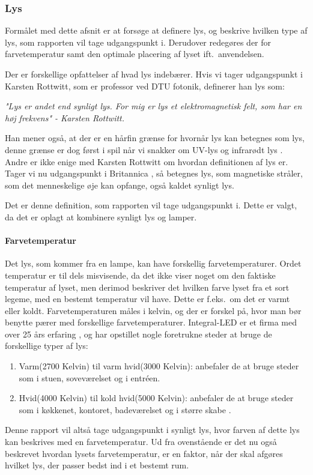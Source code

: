 \subsubsection{Lys}
\label{sec:lys}
Formålet med dette afsnit er at forsøge at definere lys, og beskrive hvilken type af lys, som rapporten vil tage udgangspunkt i. Derudover redegøres der for farvetemperatur samt den optimale placering af lyset ift.\ anvendelsen.


Der er forskellige opfattelser af hvad lys indebærer. Hvis vi tager udgangspunkt i Karsten Rottwitt, som er professor ved DTU fotonik, definerer han lys som:


\textit{"Lys er andet end synligt lys. For mig er lys et elektromagnetisk felt, som har en høj frekvens"
- Karsten Rottwitt\cite{def_lys}.}

Han mener også, at der er en hårfin grænse for hvornår lys kan betegnes som lys, denne grænse er dog først i spil når vi snakker om UV-lys og infrarødt lys \cite{def_lys}. 
Andre er ikke enige med Karsten Rottwitt om hvordan definitionen af lys er. Tager vi nu udgangspunkt i Britannica \cite{britannica_lys}, så betegnes lys, som magnetiske stråler, som det menneskelige øje kan opfange, også kaldet synligt lys. 


Det er denne definition, som rapporten vil tage udgangspunkt i. Dette er valgt, da det er oplagt at kombinere synligt lys og lamper.

\paragraph{Farvetemperatur}
Det lys, som kommer fra en lampe, kan have forskellig farvetemperaturer. Ordet temperatur er til dels misvisende, da det ikke viser noget om den faktiske temperatur af lyset, men derimod beskriver det hvilken farve lyset fra et sort legeme, med en bestemt temperatur vil have\cite{farvetemp}. Dette er f.eks.\ om det er varmt eller koldt. Farvetemperaturen måles i kelvin, og der er forskel på, hvor man bør benytte pærer med forskellige farvetemperaturer. Integral-LED er et firma med over 25 års erfaring \cite{integral_led}, og har opstillet nogle foretrukne steder at bruge de forskellige typer af lys:

\begin{enumerate}
\item Varm(2700 Kelvin) til varm hvid(3000 Kelvin): anbefaler de at bruge steder som i stuen, soveværelset og i entréen.
\item Hvid(4000 Kelvin) til kold hvid(5000 Kelvin): anbefaler de at bruge steder som i køkkenet, kontoret, badeværelset og i større skabe \cite{varm_kold}.
\end{enumerate}

Denne rapport vil altså tage udgangspunkt i synligt lys, hvor farven af dette lys kan beskrives med en farvetemperatur. Ud fra ovenstående er det nu også beskrevet hvordan lysets farvetemperatur, er en faktor, når der skal afgøres hvilket lys, der passer bedst ind i et bestemt rum.
